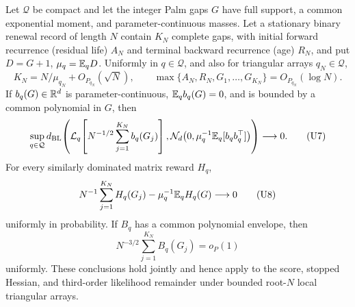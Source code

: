 \begin{lemma}
\label{lem:uniform-stopped-renewal-score-main}
Let \(\mathcal Q\) be compact and let the integer Palm gaps \(G\) have full
support, a common exponential moment, and parameter-continuous masses.  Let a
stationary binary renewal record of length \(N\) contain \(K_N\) complete
gaps, with initial forward recurrence (residual life) \(A_N\) and terminal
backward recurrence (age) \(R_N\), and put
\(D=G+1\), \(\mu_q=\mathbb E_qD\).  Uniformly in \(q\in\mathcal Q\), and also for
triangular arrays \(q_N\in\mathcal Q\),
\[
 K_N=N/\mu_{q_N}+O_{P_{q_N}}(\sqrt N),
\qquad
 \max\{A_N,R_N,G_1,\ldots,G_{K_N}\}=O_{P_{q_N}}(\log N).
\tag{U6}\label{eq:u6-supp}
\]
If \(b_q(G)\in\mathbb R^d\) is parameter-continuous,
\(\mathbb E_qb_q(G)=0\), and is bounded by a common polynomial in \(G\), then
\[
 \sup_{q\in\mathcal Q}d_{\rm BL}\!\left(
 \mathcal L_q\!\left[N^{-1/2}\sum_{j=1}^{K_N}b_q(G_j)\right],
 \mathcal N_d\!\left(0,\mu_q^{-1}\mathbb E_q[b_qb_q^\top]\right)
 \right)\longrightarrow0.
\tag{U7}\label{eq:u7-supp}
\]
For every similarly dominated matrix reward \(H_q\),
\[
 N^{-1}\sum_{j=1}^{K_N}H_q(G_j)
 -\mu_q^{-1}\mathbb E_qH_q(G)\longrightarrow0
\tag{U8}\label{eq:u8-supp}
\]
uniformly in probability.  If \(B_q\) has a common polynomial envelope, then
\[
 N^{-3/2}\sum_{j=1}^{K_N}B_q(G_j)=o_P(1)
\]
uniformly.  These conclusions
hold jointly and hence apply to the score, stopped Hessian, and third-order
likelihood remainder under bounded root-\(N\) local triangular arrays.
\end{lemma}

